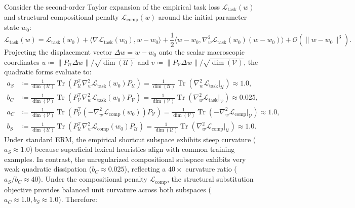 \documentclass{article}
\theoremstyle{plain}
\theoremstyle{definition}
\DeclareMathOperator{\Tr}{Tr}
\begin{document}
Consider the second-order Taylor expansion of the empirical task loss $\mathcal{L}_{\text{task}}(w)$ and structural compositional penalty $\mathcal{L}_{\text{comp}}(w)$ around the initial parameter state $w_0$:
\begin{equation}
    \mathcal{L}_{\text{task}}(w) = \mathcal{L}_{\text{task}}(w_0) + \langle \nabla \mathcal{L}_{\text{task}}(w_0), w - w_0 \rangle + \frac{1}{2} \langle w - w_0, \nabla_w^2 \mathcal{L}_{\text{task}}(w_0) (w - w_0) \rangle + \mathcal{O}(\|w - w_0\|^3).
\end{equation}
Projecting the displacement vector $\Delta w = w - w_0$ onto the scalar macroscopic coordinates $u \coloneqq \| P_{\mathcal{U}} \Delta w \| / \sqrt{\dim(\mathcal{U})}$ and $v \coloneqq \| P_{\mathcal{V}} \Delta w \| / \sqrt{\dim(\mathcal{V})}$, the quadratic forms evaluate to:
\begin{align}
    a_S &\coloneqq \frac{1}{\dim(\mathcal{U})} \Tr\left( P_{\mathcal{U}}^\top \nabla_w^2 \mathcal{L}_{\text{task}}(w_0) P_{\mathcal{U}} \right) = \frac{1}{\dim(\mathcal{U})} \Tr\left( \nabla_w^2 \mathcal{L}_{\text{task}}|_{\mathcal{U}} \right) \approx 1.0, \label{eq:app_a_S} \\
    b_C &\coloneqq \frac{1}{\dim(\mathcal{V})} \Tr\left( P_{\mathcal{V}}^\top \nabla_w^2 \mathcal{L}_{\text{task}}(w_0) P_{\mathcal{V}} \right) = \frac{1}{\dim(\mathcal{V})} \Tr\left( \nabla_w^2 \mathcal{L}_{\text{task}}|_{\mathcal{V}} \right) \approx 0.025, \label{eq:app_b_C} \\
    a_C &\coloneqq \frac{1}{\dim(\mathcal{V})} \Tr\left( P_{\mathcal{V}}^\top (-\nabla_w^2 \mathcal{L}_{\text{comp}}(w_0)) P_{\mathcal{V}} \right) = \frac{1}{\dim(\mathcal{V})} \Tr\left( -\nabla_w^2 \mathcal{L}_{\text{comp}}|_{\mathcal{V}} \right) \approx 1.0, \label{eq:app_a_C} \\
    b_S &\coloneqq \frac{1}{\dim(\mathcal{U})} \Tr\left( P_{\mathcal{U}}^\top \nabla_w^2 \mathcal{L}_{\text{comp}}(w_0) P_{\mathcal{U}} \right) = \frac{1}{\dim(\mathcal{U})} \Tr\left( \nabla_w^2 \mathcal{L}_{\text{comp}}|_{\mathcal{U}} \right) \approx 1.0. \label{eq:app_b_S}
\end{align}
Under standard ERM, the empirical shortcut subspace exhibits steep curvature ($a_S \approx 1.0$) because superficial lexical heuristics align with common training examples. In contrast, the unregularized compositional subspace exhibits very weak quadratic dissipation ($b_C \approx 0.025$), reflecting a $40\times$ curvature ratio ($a_S / b_C \approx 40$). Under the compositional penalty $\mathcal{L}_{\text{comp}}$, the structural substitution objective provides balanced unit curvature across both subspaces ($a_C \approx 1.0, b_S \approx 1.0$). Therefore:
\end{document}
